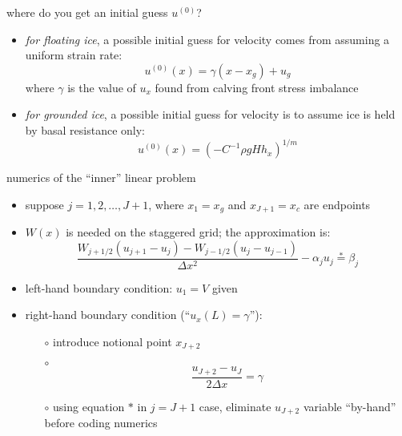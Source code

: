 \begin{frame}{where do you get an initial guess $u^{(0)}$?}

\begin{itemize}
\item \emph{for floating ice}, a possible initial guess for velocity comes from assuming a uniform strain rate:
   $$u^{(0)}(x) = \gamma (x-x_g) + u_g$$
where $\gamma$ is the value of $u_x$ found from calving front stress imbalance
\item \emph{for grounded ice}, a possible initial guess for velocity is to assume ice is held by basal resistance only:
   $$u^{(0)}(x) = \left(-C^{-1} \rho g H h_x\right)^{1/m}$$
\end{itemize}
\end{frame}


\begin{frame}{numerics of the ``inner'' linear problem}

\begin{itemize}
\item suppose $j=1,2,\dots,J+1$, where $x_1 = x_g$ and $x_{J+1} = x_c$ are endpoints
\item $W(x)$ is needed on the staggered grid; the approximation is:
$$\frac{W_{j+1/2} (u_{j+1} - u_j) - W_{j-1/2} (u_{j} - u_{j-1})}{\Delta x^2} - \alpha_j u_j \stackrel{\ast}{=} \beta_j$$
\item left-hand boundary condition: $u_1 = V$ given
\item right-hand boundary condition (``$u_x(L)=\gamma$''):
  \begin{itemize}
  \item[$\circ$] introduce notional point $x_{J+2}$
  \item[$\circ$]
    $$\frac{u_{J+2} - u_J}{2 \Delta x} = \gamma$$
  \item[$\circ$] using equation $\ast$ in $j=J+1$ case, eliminate $u_{J+2}$ variable ``by-hand'' before coding numerics \nocite{MortonMayers}
  \end{itemize}
\end{itemize}
\end{frame}


